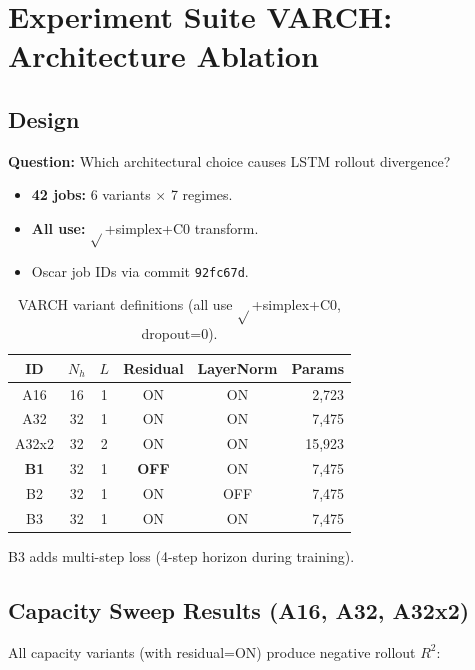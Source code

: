 \documentclass[11pt]{article}
\newcommand{\Rtwo}{R^2}
\newcommand{\good}[1]{\textcolor{goodgreen}{\textbf{#1}}}
\begin{document}
\section{Experiment Suite VARCH: Architecture Ablation}
\label{sec:varch}

\subsection{Design}

\textbf{Question:} Which architectural choice causes LSTM rollout divergence?

\begin{itemize}[nosep]
  \item \textbf{42 jobs:} 6 variants $\times$ 7 regimes.
  \item \textbf{All use:} $\sqrt{}$+simplex+C0 transform.
  \item Oscar job IDs via commit \texttt{92fc67d}.
\end{itemize}

\begin{table}[H]
\centering
\caption{VARCH variant definitions (all use $\sqrt{}$+simplex+C0, dropout=0).}
\label{tab:varch-design}
\small
\begin{tabular}{@{}cccccr@{}}
\toprule
ID & $N_h$ & $L$ & Residual & LayerNorm & Params \\
\midrule
A16   & 16 & 1 & ON  & ON  & 2,723  \\
A32   & 32 & 1 & ON  & ON  & 7,475  \\
A32x2 & 32 & 2 & ON  & ON  & 15,923 \\
\midrule
\textbf{B1}   & 32 & 1 & \good{OFF} & ON  & 7,475  \\
B2    & 32 & 1 & ON  & OFF & 7,475  \\
B3    & 32 & 1 & ON  & ON  & 7,475  \\
\bottomrule
\end{tabular}
\end{table}

B3 adds multi-step loss (4-step horizon during training).

\subsection{Capacity Sweep Results (A16, A32, A32x2)}

All capacity variants (with residual=ON) produce negative rollout $\Rtwo$:
\end{document}
